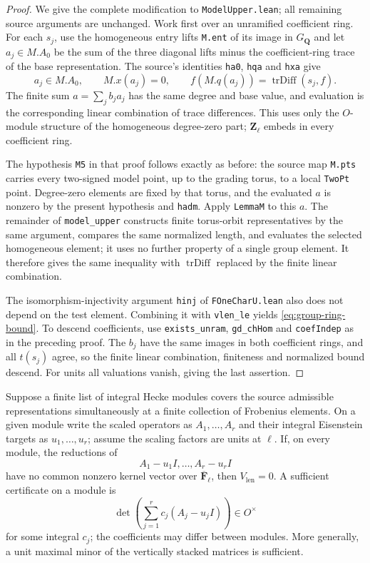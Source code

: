 \begin{proof}
We give the complete modification to \texttt{ModelUpper.lean}; all
remaining source arguments are unchanged. Work first over an
unramified coefficient ring. For each $s_j$, use the homogeneous
entry lifts \texttt{M.ent} of its image in $G_{\mathbf Q}$ and let
$a_j\in M.A_0$ be the sum of the three diagonal lifts minus the
coefficient-ring trace of the base representation. The source's
identities \texttt{ha0}, \texttt{hqa} and \texttt{hxa} give
\[
 a_j\in M.A_0,\qquad M.x(a_j)=0,\qquad
 f(M.q(a_j))=\operatorname{trDiff}(s_j,f).
\]
The finite sum $a=\sum_j b_j a_j$ has the same degree and base value,
and evaluation is the corresponding linear combination of trace
differences. This uses only the $O$-module structure of the homogeneous
degree-zero part; $\mathbf Z_\ell$ embeds in every coefficient ring.

The hypothesis \texttt{M5} in that proof follows exactly as before:
the source map \texttt{M.pts} carries every two-signed model point,
up to the grading torus, to a local \texttt{TwoPt} point. Degree-zero
elements are fixed by that torus, and the evaluated $a$ is nonzero by
the present hypothesis and \texttt{hadm}. Apply \texttt{LemmaM} to
this $a$. The remainder of \texttt{model\_upper} constructs finite
torus-orbit representatives by the same argument, compares the same normalized
length, and evaluates the selected homogeneous element; it uses no
further property of a single group element. It therefore gives the
same inequality with $\operatorname{trDiff}$ replaced by the finite
linear combination.

The isomorphism-injectivity argument \texttt{hinj} of
\texttt{FOneCharU.lean} also does not depend on the test element.
Combining it with \texttt{vlen\_le} yields
\eqref{eq:group-ring-bound}. To descend coefficients, use
\texttt{exists\_unram}, \texttt{gd\_chHom} and \texttt{coefIndep}
as in the preceding proof. The $b_j$ have the same images in both
coefficient rings, and all $t(s_j)$ agree, so the finite linear
combination, finiteness and normalized bound descend. For units all
valuations vanish, giving the last assertion.
\end{proof}

\begin{corollary}\label{cor:joint-hecke-test}
Suppose a finite list of integral Hecke modules covers the source
admissible representations simultaneously at a finite collection of
Frobenius elements. On a given module write the scaled operators as
$A_1,\ldots,A_r$ and their integral Eisenstein targets as
$u_1,\ldots,u_r$; assume the scaling factors are units at $\ell$.
If, on every module, the reductions of
\[
 A_1-u_1I,\ldots,A_r-u_rI
\]
have no common nonzero kernel vector over
$\overline{\mathbf F}_\ell$, then $V_{\mathrm{len}}=0$.
A sufficient certificate on a module is
\[
 \det\left(\sum_{j=1}^r c_j(A_j-u_jI)\right)
       \in O^\times
\]
for some integral $c_j$; the coefficients may differ between modules.
More generally, a unit maximal minor of the vertically stacked
matrices is sufficient.
\end{corollary}

